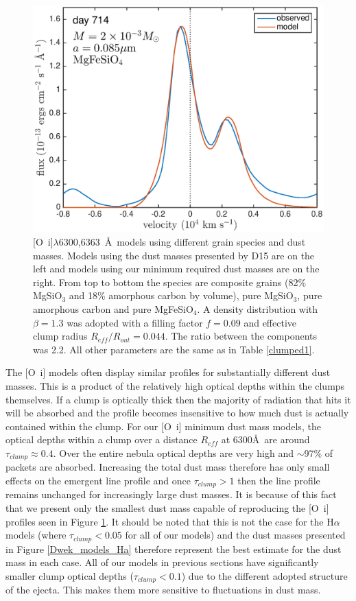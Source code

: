 \documentclass[useAMS,usenatbib,usegraphicx]{mnras}
\begin{document}
\begin{figure}
\includegraphics[trim =25 0 0 -25,clip=true,scale=0.25]{silicates_take2/OI/MgFeSiO4_bestfit}

\caption{[O~{\sc i}]$\lambda$6300,6363~\AA\ models using different grain species and dust masses.  Models using the dust masses presented by D15 are on the left and models using our minimum required dust masses are on the right.  From top to bottom the species are composite grains (82\% MgSiO$_3$ and 18\% amorphous carbon by volume), pure MgSiO$_3$, pure amorphous carbon and pure MgFeSiO$_4$.  A density distribution with $\beta=1.3$ was adopted with a filling factor $f=0.09$ and effective clump radius $R_{eff}/R_{out}=0.044$.  The ratio between the components was 2.2.  All other parameters are the same as in Table \ref{clumped1}.}
\label{Dwek_models_OI}
\end{figure}

The [O~{\sc i}] models often display similar profiles for substantially different dust masses.  This is  a product of the relatively high optical depths within the clumps themselves. If a clump is optically thick then the majority of radiation that hits it will be absorbed and the profile becomes insensitive to how much dust is actually contained within the clump.  For our [O~{\sc i}] minimum dust mass models, the optical depths within a clump over a distance $R_{eff}$ at 6300\AA\ are around $\tau_{clump} \approx 0.4$.  Over the entire nebula optical depths are very high and $\sim$97\% of packets are absorbed.  Increasing the total dust mass therefore has only small effects on the emergent line profile and once $\tau_{clump}>1$ then the line profile  remains unchanged for increasingly large dust masses.  It is because of this fact that we present only the smallest dust mass capable of reproducing the [O~{\sc i}] profiles seen in Figure \ref{Dwek_models_OI}.  It should be noted that this is not the case for the H$\alpha$ models (where $\tau_{clump} < 0.05$ for all of our models) and the dust masses presented in Figure \ref{Dwek_models_Ha} therefore represent the best estimate for the dust mass in each case.  All of our models in previous sections have significantly smaller clump optical depths ($\tau_{clump}<0.1$) due to the different adopted structure of the ejecta.  This makes them more sensitive to fluctuations in dust mass.
\end{document}
